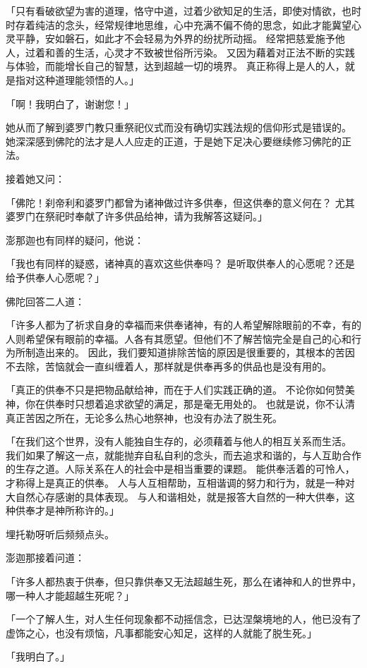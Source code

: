 \documentclass[twoside,openany]{book}
\begin{document}
「只有看破欲望为害的道理，恪守中道，过着少欲知足的生活，即使对情欲，也时时存着纯洁的念头，经常规律地思维，心中充满不偏不倚的思念，如此才能冀望心灵平静，安如磐石，如此才不会轻易为外界的纷扰所动摇。
经常把慈爱施予他人，过着和善的生活，心灵才不致被世俗所污染。
又因为藉着对正法不断的实践与体验，而能增长自己的智慧，达到超越一切的境界。
真正称得上是人的人，就是指对这种道理能领悟的人。」

「啊！我明白了，谢谢您！」

她从而了解到婆罗门教只重祭祀仪式而没有确切实践法规的信仰形式是错误的。
她深深感到佛陀的法才是人人应走的正道，于是她下足决心要继续修习佛陀的正法。

接着她又问：

「佛陀！刹帝利和婆罗门都曾为诸神做过许多供奉，但这供奉的意义何在？
尤其婆罗门在祭祀时奉献了许多供品给神，请为我解答这疑问。」

澎那迦也有同样的疑问，他说：

「我也有同样的疑惑，诸神真的喜欢这些供奉吗？
是听取供奉人的心愿呢？还是给予供奉人心愿呢？」

佛陀回答二人道：

「许多人都为了祈求自身的幸福而来供奉诸神，有的人希望解除眼前的不幸，有的人则希望保有眼前的幸福。人各有其愿望。但他们不了解苦恼完全是自己的心和行为所制造出来的。
因此，我们要知道排除苦恼的原因是很重要的，其根本的苦因不去除，苦恼就会一直纠缠着人，那样就是供奉再多的供品也是没有用的。

「真正的供奉不只是把物品献给神，而在于人们实践正确的道。
不论你如何赞美神，你在供奉时只想着追求欲望的满足，那是毫无用处的。
也就是说，你不认清真正苦因之所在，无论多么热心地祭神，也没有办法了脱生死。

「在我们这个世界，没有人能独自生存的，必须藉着与他人的相互关系而生活。
我们如果了解这一点，就能抛弃自私自利的念头，而去追求和谐的，与人互助合作的生存之道。人际关系在人的社会中是相当重要的课题。
能供奉活着的可怜人，才称得上是真正的供奉。
人与人互相帮助，互相谐调的努力和行为，就是一种对大自然心存感谢的具体表现。
与人和谐相处，就是报答大自然的一种大供奉，这种供奉才是神所称许的。」

埋托勒呀听后频频点头。

澎迦那接着问道：

「许多人都热衷于供奉，但只靠供奉又无法超越生死，那么在诸神和人的世界中，哪一种人才能超越生死呢？」

「一个了解人生，对人生任何现象都不动摇信念，已达涅槃境地的人，他已没有了虚饰之心，也没有烦恼，凡事都能安心知足，这样的人就能了脱生死。」

「我明白了。」
\end{document}
